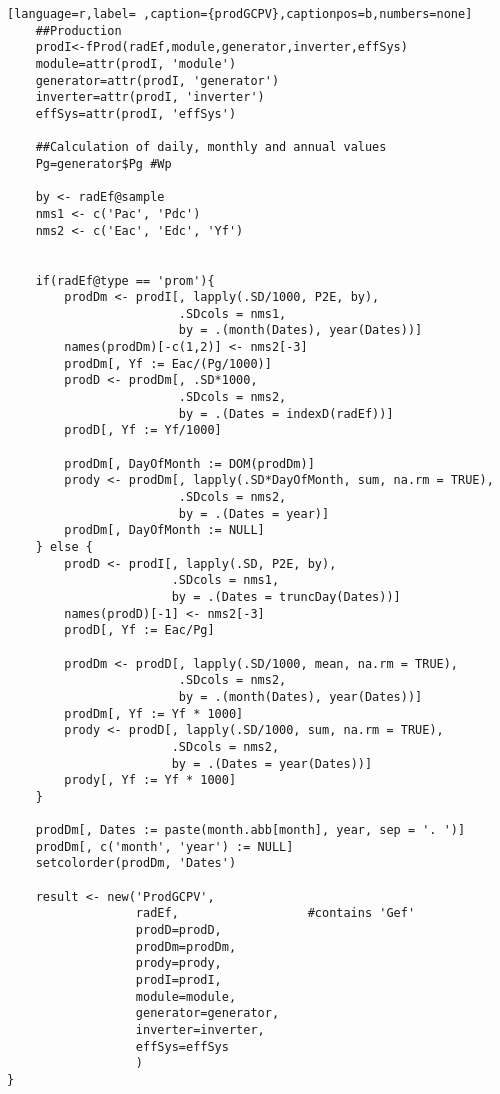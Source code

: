 \begin{lstlisting}[language=r,label= ,caption={prodGCPV},captionpos=b,numbers=none]
    ##Production
    prodI<-fProd(radEf,module,generator,inverter,effSys)
    module=attr(prodI, 'module')
    generator=attr(prodI, 'generator')
    inverter=attr(prodI, 'inverter')
    effSys=attr(prodI, 'effSys')

    ##Calculation of daily, monthly and annual values
    Pg=generator$Pg #Wp

    by <- radEf@sample
    nms1 <- c('Pac', 'Pdc')
    nms2 <- c('Eac', 'Edc', 'Yf')


    if(radEf@type == 'prom'){
        prodDm <- prodI[, lapply(.SD/1000, P2E, by),
                        .SDcols = nms1,
                        by = .(month(Dates), year(Dates))]
        names(prodDm)[-c(1,2)] <- nms2[-3]
        prodDm[, Yf := Eac/(Pg/1000)]
        prodD <- prodDm[, .SD*1000,
                        .SDcols = nms2,
                        by = .(Dates = indexD(radEf))]
        prodD[, Yf := Yf/1000]

        prodDm[, DayOfMonth := DOM(prodDm)]
        prody <- prodDm[, lapply(.SD*DayOfMonth, sum, na.rm = TRUE),
                        .SDcols = nms2,
                        by = .(Dates = year)]
        prodDm[, DayOfMonth := NULL]
    } else {
        prodD <- prodI[, lapply(.SD, P2E, by),
                       .SDcols = nms1,
                       by = .(Dates = truncDay(Dates))]
        names(prodD)[-1] <- nms2[-3]
        prodD[, Yf := Eac/Pg]

        prodDm <- prodD[, lapply(.SD/1000, mean, na.rm = TRUE),
                        .SDcols = nms2,
                        by = .(month(Dates), year(Dates))]
        prodDm[, Yf := Yf * 1000]
        prody <- prodD[, lapply(.SD/1000, sum, na.rm = TRUE),
                       .SDcols = nms2,
                       by = .(Dates = year(Dates))]
        prody[, Yf := Yf * 1000]
    }

    prodDm[, Dates := paste(month.abb[month], year, sep = '. ')]
    prodDm[, c('month', 'year') := NULL]
    setcolorder(prodDm, 'Dates')

    result <- new('ProdGCPV',
                  radEf,                  #contains 'Gef'
                  prodD=prodD,
                  prodDm=prodDm,
                  prody=prody,
                  prodI=prodI,
                  module=module,
                  generator=generator,
                  inverter=inverter,
                  effSys=effSys
                  )
}
\end{lstlisting}
